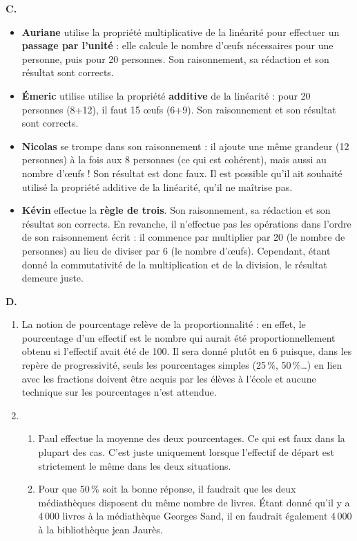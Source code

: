 {\bf C.}
\begin{itemize}
   \item {\bf Auriane} utilise la propriété multiplicative de la linéarité pour effectuer un {\bf passage par l'unité} : elle calcule le nombre d'\oe ufs nécessaires pour une personne, puis pour 20 personnes. Son raisonnement, sa rédaction et son résultat sont corrects.
   \item {\bf Émeric} utilise utilise la propriété {\bf additive} de la linéarité : pour 20 personnes (8+12), il faut 15 \oe ufs (6+9). Son raisonnement et son résultat sont corrects.
   \item {\bf Nicolas} se trompe dans son raisonnement : il ajoute une même grandeur (12 personnes) à la fois aux 8 personnes (ce qui est cohérent), mais aussi au nombre d'\oe ufs ! Son résultat est donc faux. Il est possible qu'il ait souhaité utilisé la propriété additive de la linéarité, qu'il ne maîtrise pas.
   \item {\bf Kévin} effectue la {\bf règle de trois}. Son raisonnement, sa rédaction et son résultat son corrects. En revanche, il n'effectue pas les opérations dans l'ordre de son raisonnement écrit : il commence par multiplier par 20 (le nombre de personnes) au lieu de diviser par 6 (le nombre d'\oe ufs). Cependant, étant donné la commutativité de la multiplication et de la division, le résultat demeure juste. \\
\end{itemize}

{\bf D.}
\begin{enumerate}
   \item La notion de pourcentage relève de la proportionnalité : en effet, le pourcentage d'un effectif est le nombre qui aurait été proportionnellement obtenu si l'effectif avait été de 100. Il sera donné plutôt en 6 puisque, dans les repère de progressivité, seuls les pourcentages simples (25\,\%, 50\,\%\dots) en lien avec les fractions doivent être acquis par les élèves à l'école et aucune technique sur les pourcentages n'est attendue.
   \item
   \begin{enumerate}
      \item Paul effectue la moyenne des deux pourcentages. Ce qui est faux dans la plupart des cas. C'est juste uniquement lorsque l'effectif de départ est strictement le même dans les deux situations.
      \item Pour que 50\,\% soit la bonne réponse, il faudrait que les deux médiathèques disposent du même nombre de livres. Étant donné qu'il y a 4\,000 livres à la médiathèque Georges Sand, il en faudrait également 4\,000 à la bibliothèque jean Jaurès.
   \end{enumerate}
\end{enumerate}
